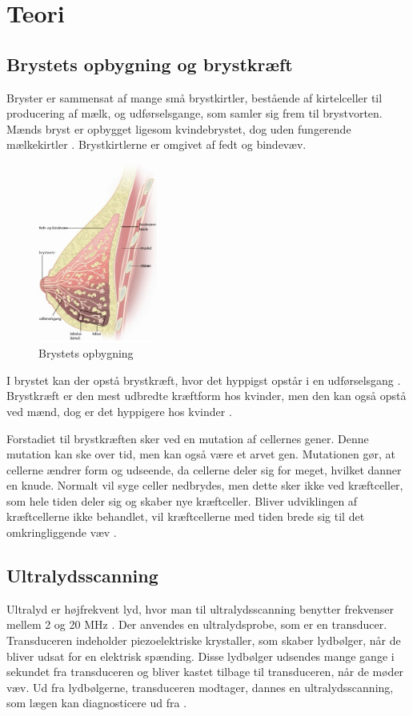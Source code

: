 \chapter{Teori}\label{Teori}

\section{Brystets opbygning og brystkræft}
Bryster er sammensat af mange små brystkirtler, bestående af kirtelceller til producering af mælk, og udførselsgange, som samler sig frem til brystvorten. Mænds bryst er opbygget ligesom kvindebrystet, dog uden fungerende mælkekirtler \cite{Mand}. Brystkirtlerne er omgivet af fedt og bindevæv\citep{Bryst}.

\begin{figure}[H]
    \centering
    \includegraphics[width=0.35\textwidth]{figurer/r/bryst}
    \caption{Brystets opbygning \citep{Bryst}}
    \label{Brystet}
\end{figure}

I brystet kan der opstå brystkræft, hvor det hyppigst opstår i en udførselsgang \citep{Bryst}. Brystkræft er den mest udbredte kræftform hos kvinder, men den kan også opstå ved mænd, dog er det hyppigere hos kvinder \cite{Mand}.

Forstadiet til brystkræften sker ved en mutation af cellernes gener. Denne mutation kan ske over tid, men kan også være et arvet gen. Mutationen gør, at cellerne ændrer form og udseende, da cellerne deler sig for meget, hvilket danner en knude. Normalt vil syge celler nedbrydes, men dette sker ikke ved kræftceller, som hele tiden deler sig og skaber nye kræftceller. Bliver udviklingen af kræftcellerne ikke behandlet, vil kræftcellerne med tiden brede sig til det omkringliggende væv \cite{Udvikling}. 

\section{Ultralydsscanning}
Ultralyd er højfrekvent lyd, hvor man til ultralydsscanning benytter frekvenser mellem 2 og 20 MHz \cite{HUSK}. Der anvendes en ultralydsprobe, som er en transducer. Transduceren indeholder piezoelektriske krystaller, som skaber lydbølger, når de bliver udsat for en elektrisk spænding. Disse lydbølger udsendes mange gange i sekundet fra transduceren og bliver kastet tilbage til transduceren, når de møder væv. Ud fra lydbølgerne, transduceren modtager, dannes en ultralydsscanning, som lægen kan diagnosticere ud fra \cite{Ultralydsscanning}.

